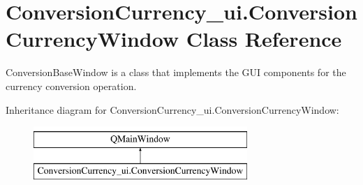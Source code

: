 \hypertarget{class_conversion_currency__ui_1_1_conversion_currency_window}{}\section{Conversion\+Currency\+\_\+ui.\+Conversion\+Currency\+Window Class Reference}
\label{class_conversion_currency__ui_1_1_conversion_currency_window}


Conversion\+Base\+Window is a class that implements the G\+UI components for the currency conversion operation.  


Inheritance diagram for Conversion\+Currency\+\_\+ui.\+Conversion\+Currency\+Window\+:\begin{figure}[H]
\begin{center}
\leavevmode
\includegraphics[height=2.000000cm]{class_conversion_currency__ui_1_1_conversion_currency_window}
\end{center}
\end{figure}
